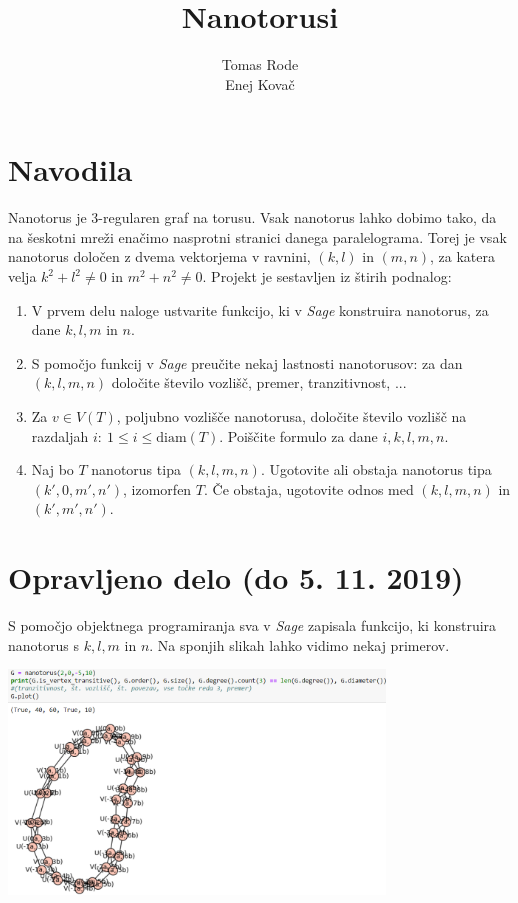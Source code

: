 \documentclass[a4paper, 11 pt]{article}
\title{Nanotorusi}
\author{Tomas Rode \\ Enej Kovač}
\begin{document}
\maketitle

\section{Navodila}

Nanotorus je 3-regularen graf na torusu. Vsak nanotorus lahko dobimo tako, da na šeskotni mreži enačimo nasprotni stranici danega paralelograma. Torej je vsak nanotorus določen z dvema vektorjema v ravnini, $(k,l)$ in $(m, n)$, za katera velja $k^2 + l^2 \neq 0$ in $m^2 + n^2 \neq 0$. Projekt je sestavljen iz štirih podnalog:

\begin{enumerate}
  \item V prvem delu naloge ustvarite funkcijo, ki v \textit{Sage} konstruira nanotorus, za dane $k, l, m$ in $n$.
  \item S pomočjo funkcij v \textit{Sage} preučite nekaj lastnosti nanotorusov: za dan $(k, l, m, n)$ določite število vozlišč, premer, tranzitivnost, ...
  \item Za $v \in V(T)$, poljubno vozlišče nanotorusa, določite število vozlišč na razdaljah $i:\ 1 \leq i \leq \textrm{diam}(T)$. Poiščite formulo za dane $i, k, l, m, n$.
  \item Naj bo $T$ nanotorus tipa $(k, l, m, n)$. Ugotovite ali obstaja nanotorus tipa $(k', 0, m', n')$, izomorfen $T$. Če obstaja, ugotovite odnos med $(k, l, m, n)$ in $(k', m', n')$.
\end{enumerate}

\section{Opravljeno delo (do 5. 11. 2019)}

S pomočjo objektnega programiranja sva v \textit{Sage} zapisala funkcijo, ki konstruira nanotorus s $k, l, m$ in $n$. Na sponjih slikah lahko vidimo nekaj primerov.

\begin{center}
\includegraphics[width=10cm]{nano2}
\end{center}
\vspace{1cm}
\end{document}
